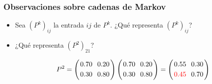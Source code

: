 {\nologo
\begin{frame}\frametitle{Observaciones sobre cadenas de Markov}
	
	\begin{itemize}\justifying 
		\item Sea $\left(P^k\right)_{ij}$ la entrada $ij$ de $P^k$. ¿Qué representa $\left(P^k\right)_{ij}$?
		
		\vspace{5mm}
		\item ¿Qué representa {\color{red}$\left(P^2\right)_{21}$}?
		
		\[
		P^2 =
		\left(
		\begin{array}{@{\hspace{0.2\tabcolsep}}c@{\hspace{1.2\tabcolsep}}c@{\hspace{0.2\tabcolsep}}}
		0.70 & 0.20 \\[1mm]
		0.30 & 0.80
		\end{array}
		\right)
		\left(
		\begin{array}{@{\hspace{0.2\tabcolsep}}c@{\hspace{1.2\tabcolsep}}c@{\hspace{0.2\tabcolsep}}}
		0.70 & 0.20 \\[1mm]
		0.30 & 0.80
		\end{array}
		\right)
		=
		\left(
		\begin{array}{@{\hspace{0.2\tabcolsep}}c@{\hspace{1.2\tabcolsep}}c@{\hspace{0.2\tabcolsep}}}
		0.55 & 0.30 \\[1mm]
		{\color{red}0.45} & 0.70
		\end{array}
		\right)
		\]		
	\end{itemize}
	

\end{frame}}

